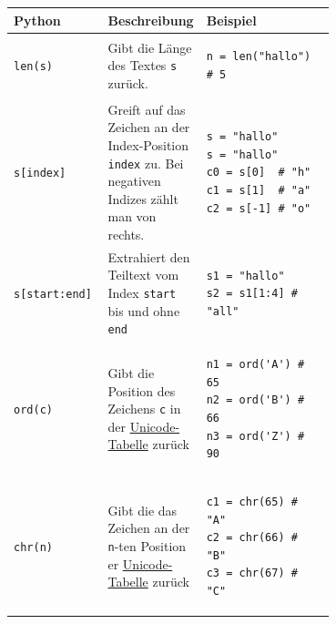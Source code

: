 \begin{table}[H]
 \centering
\begin{tabular}{l|p{0.3\linewidth}|p{0.4\linewidth}}
\textbf{Python} & \textbf{Beschreibung} & \textbf{Beispiel} \\\midrule\midrule
\lstinline|len(s)| & Gibt die Länge des Textes \lstinline|s| zurück. & 

\begin{minipage}{\linewidth}
\begin{lstlisting}[numbers=none]
n = len("hallo") # 5
\end{lstlisting}
\end{minipage} \\\midrule\midrule
\lstinline|s[index]| & Greift auf das Zeichen an der Index-Position \lstinline|index| zu. Bei negativen Indizes zählt man von rechts. & \begin{minipage}{\linewidth}
\begin{lstlisting}[numbers=none]
s = "hallo"
s = "hallo"
c0 = s[0]  # "h"
c1 = s[1]  # "a"
c2 = s[-1] # "o"
\end{lstlisting}
\end{minipage}
 \\\midrule
\lstinline|s[start:end]| & Extrahiert den Teiltext vom Index \lstinline|start| bis und ohne \lstinline|end| & \begin{minipage}{\linewidth}
\begin{lstlisting}[numbers=none]
s1 = "hallo"
s2 = s1[1:4] # "all"
\end{lstlisting}
\end{minipage}\\\midrule\midrule
\lstinline|ord(c)| & Gibt die Position des Zeichens \lstinline|c| in der \href{https://en.wikipedia.org/wiki/List_of_Unicode_characters}{Unicode-Tabelle} zurück & \begin{minipage}{\linewidth}
\begin{lstlisting}[numbers=none]
n1 = ord('A') # 65
n2 = ord('B') # 66
n3 = ord('Z') # 90
\end{lstlisting}
\end{minipage}\\\midrule
\lstinline|chr(n)| & Gibt die das Zeichen an der \lstinline|n|-ten Position er \href{https://en.wikipedia.org/wiki/List_of_Unicode_characters}{Unicode-Tabelle} zurück & \begin{minipage}{\linewidth}
\begin{lstlisting}[numbers=none]
c1 = chr(65) # "A"
c2 = chr(66) # "B"
c3 = chr(67) # "C"
\end{lstlisting}\end{minipage}\\\midrule\midrule

\end{tabular}
\end{table}
